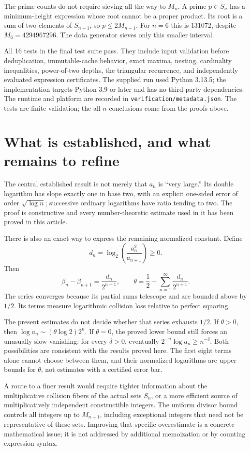 \documentclass[11pt,a4paper]{article}
\theoremstyle{definition}
\theoremstyle{remark}
\renewcommand{\lg}{\log_2}
\begin{document}
The prime counts do not require sieving all the way to $M_n$.
A prime $p\in S_n$ has a minimum-height expression whose root cannot be a
proper product. Its root is a sum of two elements of $S_{n-1}$, so
$p\le2M_{n-1}$. For $n=6$ this is $131072$, despite
$M_6=4294967296$. The data generator sieves only this smaller interval.

All 16 tests in the final test suite pass. They include input validation
before deduplication, immutable-cache behavior, exact maxima, nesting,
cardinality inequalities, power-of-two depths, the triangular recurrence,
and independently evaluated expression certificates. The supplied run used
Python 3.13.5; the implementation targets Python 3.9 or later and has no
third-party dependencies. The runtime and platform are recorded in
\texttt{verification/metadata.json}. The tests are finite validation;
the all-$n$ conclusions come from the proofs above.

\section{What is established, and what remains to refine}\label{sec:scope}
The central established result is not merely that $a_n$ is ``very large.''
Its double logarithm has slope exactly one in base two, with an explicit
one-sided error of order $\sqrt{\log n}$; successive ordinary logarithms
have ratio tending to two. The proof is constructive and every
number-theoretic estimate used in it has been proved in this article.

There is also an exact way to express the remaining normalized constant.
Define
\[
 d_n=\lg\left(\frac{a_n^2}{a_{n+1}}\right)\ge0.
\]
Then
\[
 \beta_n-\beta_{n+1}=\frac{d_n}{2^{n+1}},\qquad
 \theta=\frac12-\sum_{n=1}^{\infty}\frac{d_n}{2^{n+1}}.
\]
The series converges because its partial sums telescope and are bounded
above by $1/2$. Its terms measure logarithmic collision loss relative to
perfect squaring.

The present estimates do not decide whether that series exhausts $1/2$.
If $\theta>0$, then $\log a_n\sim(\theta\log2)2^n$.
If $\theta=0$, the proved lower bound still forces an unusually slow
vanishing: for every $\delta>0$, eventually
$2^{-n}\log a_n\ge n^{-\delta}$. Both possibilities are consistent with
the results proved here. The first eight terms alone cannot choose
between them, and their normalized logarithms are upper bounds for
$\theta$, not estimates with a certified error bar.

A route to a finer result would require tighter information about the
multiplicative collision fibers of the actual sets $S_n$, or a more
efficient source of multiplicatively independent constructible integers.
The uniform divisor bound controls all integers up to $M_{n+1}$, including
exceptional integers that need not be representative of these sets.
Improving that specific overestimate is a concrete mathematical issue;
it is not addressed by additional memoization or by counting expression
syntax.
\end{document}
